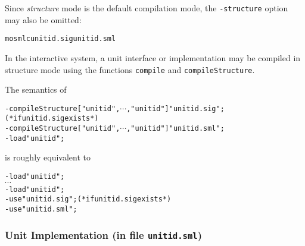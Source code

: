 \documentclass[fleqn]{article}
\def\allttcdots{\ensuremath{\cdots}}
\begin{document}
Since \emph{structure} mode is the default compilation mode, the {\tt -structure} option
may also be omitted:

\begin{alltt}
mosmlc unitid.sig unitid.sml 
\end{alltt}

In the interactive system, a unit interface or implementation may
be compiled in structure mode using the functions {\tt compile} 
and {\tt compileStructure}.

The semantics of
\begin{alltt}
- compileStructure ["unitid\et",\allttcdots,"unitid\n"] "unitid.sig";(* if unitid.sig exists *) 
- compileStructure ["unitid\et",\allttcdots,"unitid\n"] "unitid.sml";
- load "unitid";
\end{alltt}
is roughly equivalent to
\begin{alltt}
- load "unitid\et";
\allttcdots
- load "unitid\n";
- use "unitid.sig"; (* if unitid.sig exists *)
- use "unitid.sml";
\end{alltt}


\subsubsection*{Unit Implementation (in file {\tt unitid.sml})}
\end{document}
